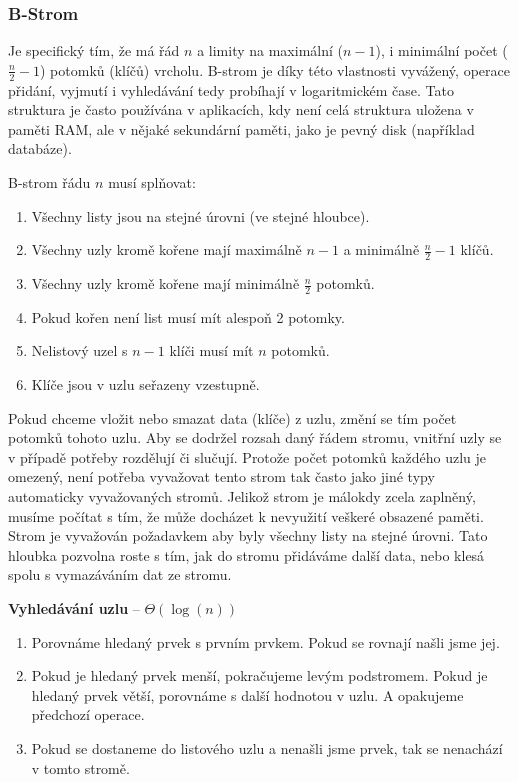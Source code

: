 \subsubsection{B-Strom}
Je specifický tím, že má řád $n$ a limity na maximální ($n-1$), i minimální počet ($\frac{n}{2}-1$) potomků (klíčů) vrcholu. B-strom je díky této vlastnosti vyvážený, operace přidání, vyjmutí i vyhledávání tedy probíhají v logaritmickém čase. Tato struktura je často používána v aplikacích, kdy není celá struktura uložena v paměti RAM, ale v nějaké sekundární paměti, jako je pevný disk (například databáze). 

B-strom řádu $n$ musí splňovat:
\begin{enumerate}
\item Všechny listy jsou na stejné úrovni (ve stejné hloubce).
\item Všechny uzly kromě kořene mají maximálně $n-1$ a minimálně $\frac{n}{2}-1$ klíčů.
\item Všechny uzly kromě kořene mají minimálně $\frac{n}{2}$ potomků.
\item Pokud kořen není list musí mít alespoň 2 potomky.
\item Nelistový uzel s $n-1$ klíči musí mít $n$ potomků.
\item Klíče jsou v uzlu seřazeny vzestupně.
\end{enumerate}

Pokud chceme vložit nebo smazat data (klíče) z uzlu, změní se tím počet potomků tohoto uzlu. Aby se dodržel rozsah daný řádem stromu, vnitřní uzly se v případě potřeby rozdělují či slučují. Protože počet potomků každého uzlu je omezený, není potřeba vyvažovat tento strom tak často jako jiné typy automaticky vyvažovaných stromů. Jelikož strom je málokdy zcela zaplněný, musíme počítat s tím, že může docházet k nevyužití veškeré obsazené paměti.
Strom je vyvažován požadavkem aby byly všechny listy na stejné úrovni. Tato hloubka pozvolna roste s tím, jak do stromu přidáváme další data, nebo klesá spolu s vymazáváním dat ze stromu.

\textbf{Vyhledávání uzlu} -- $\Theta(\log(n))$\\
\begin{enumerate}
\item Porovnáme hledaný prvek s prvním prvkem. Pokud se rovnají našli jsme jej.
\item Pokud je hledaný prvek menší, pokračujeme levým podstromem. Pokud je hledaný prvek větší, porovnáme s další hodnotou v uzlu. A opakujeme předchozí operace.
\item Pokud se dostaneme do listového uzlu a nenašli jsme prvek, tak se nenachází v tomto stromě.
\end{enumerate}

